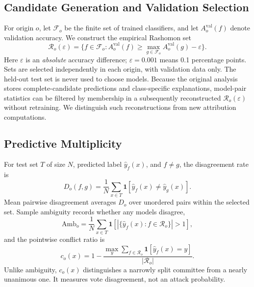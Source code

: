 \documentclass[10pt,conference]{IEEEtran}
\newcommand{\eps}{\varepsilon}
\newcommand{\R}{\mathcal{R}}
\newcommand{\I}{\mathbf{1}}
\begin{document}
\subsection{Candidate Generation and Validation Selection}
For origin $o$, let $\mathcal F_o$ be the finite set of trained classifiers, and let $A_o^{\mathrm{val}}(f)$ denote validation accuracy. We construct the empirical Rashomon set
\begin{equation}
\R_o(\eps)=\{f\in\mathcal F_o:A_o^{\mathrm{val}}(f)\geq \max_{g\in\mathcal F_o} A_o^{\mathrm{val}}(g)-\eps\}.
\label{eq:rashomon}
\end{equation}
Here $\eps$ is an \emph{absolute} accuracy difference; $\eps=0.001$ means 0.1 percentage points. Sets are selected independently in each origin, with validation data only. The held-out test set is never used to choose models. Because the original analysis stores complete-candidate predictions and class-specific explanations, model-pair statistics can be filtered by membership in a subsequently reconstructed $\R_o(\eps)$ without retraining. We distinguish such reconstructions from new attribution computations.

\subsection{Predictive Multiplicity}
For test set $T$ of size $N$, predicted label $\hat y_f(x)$, and $f\neq g$, the disagreement rate is
\begin{equation}
 D_o(f,g)=\frac{1}{N}\sum_{x\in T}\I[\hat y_f(x)\neq\hat y_g(x)].
 \label{eq:pair}
\end{equation}
Mean pairwise disagreement averages $D_o$ over unordered pairs within the selected set. Sample ambiguity records whether any models disagree,
\begin{equation}
 \mathrm{Amb}_o=\frac{1}{N}\sum_{x\in T}\I[|\{\hat y_f(x):f\in\R_o\}|>1],
 \label{eq:ambiguity}
\end{equation}
and the pointwise conflict ratio is
\begin{equation}
 c_o(x)=1-\frac{\max_y\sum_{f\in\R_o}\I[\hat y_f(x)=y]}{|\R_o|}.
 \label{eq:conflict}
\end{equation}
Unlike ambiguity, $c_o(x)$ distinguishes a narrowly split committee from a nearly unanimous one. It measures vote disagreement, not an attack probability.
\end{document}
